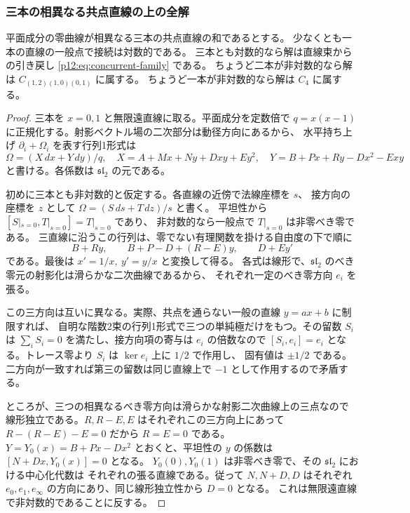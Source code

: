 \subsubsection{三本の相異なる共点直線の上の全解}
\label{p12:sec:concurrentfibers}
\begin{theorem}\label{p12:th:all-concurrent}
平面成分の零曲線が相異なる三本の共点直線の和であるとする。
少なくとも一本の直線の一般点で接続は対数的である。
三本とも対数的なら解は直線束からの引き戻し \eqref{p12:eq:concurrent-family} である。
ちょうど二本が非対数的なら解は $C_{(1,2)(1,0)(0,1)}$ に属する。
ちょうど一本が非対数的なら解は $C_4$ に属する。
\end{theorem}
\begin{proof}
三本を $x=0,1$ と無限遠直線に取る。平面成分を定数倍で
$q=x(x-1)$ に正規化する。射影ベクトル場の二次部分は動径方向にあるから、
水平持ち上げ $\partial_i+\Omega_i$ を表す行列1形式は
\[
 \Omega=(X\,dx+Y\,dy)/q,\quad
 X=A+Mx+Ny+Dxy+Ey^2,\quad
 Y=B+Px+Ry-Dx^2-Exy
\]
と書ける。各係数は $\mathfrak{sl}_2$ の元である。

初めに三本とも非対数的と仮定する。各直線の近傍で法線座標を $s$、
接方向の座標を $z$ として $\Omega=(S\,ds+T\,dz)/s$ と書く。
平坦性から $[S|_{s=0},T|_{s=0}]=T|_{s=0}$ であり、
非対数的なら一般点で $T|_{s=0}$ は非零べき零である。
三直線に沿うこの行列は、零でない有理関数を掛ける自由度の下で順に
\[
 B+Ry,\qquad B+P-D+(R-E)y,\qquad D+Ey'
\]
である。最後は $x'=1/x,\ y'=y/x$ と変換して得る。
各式は線形で、$\mathfrak{sl}_2$ のべき零元の射影化は滑らかな二次曲線であるから、
それぞれ一定のべき零方向 $e_i$ を張る。

この三方向は互いに異なる。実際、共点を通らない一般の直線 $y=ax+b$ に制限すれば、
自明な階数2束の行列1形式で三つの単純極だけをもつ。その留数 $S_i$ は
$\sum_i S_i=0$ を満たし、接方向項の寄与は $e_i$ の倍数なので
$[S_i,e_i]=e_i$ となる。トレース零より $S_i$ は $\ker e_i$ 上に $1/2$ で作用し、
固有値は $\pm1/2$ である。二方向が一致すれば第三の留数は同じ直線上で
$-1$ として作用するので矛盾する。

ところが、三つの相異なるべき零方向は滑らかな射影二次曲線上の三点なので
線形独立である。$R,R-E,E$ はそれぞれこの三方向上にあって
$R-(R-E)-E=0$ だから $R=E=0$ である。
$Y=Y_0(x)=B+Px-Dx^2$ とおくと、平坦性の $y$ の係数は $[N+Dx,Y_0(x)]=0$ となる。
$Y_0(0),Y_0(1)$ は非零べき零で、その $\mathfrak{sl}_2$ における中心化代数は
それぞれの張る直線である。従って $N,N+D,D$ はそれぞれ $e_0,e_1,e_\infty$
の方向にあり、同じ線形独立性から $D=0$ となる。
これは無限遠直線で非対数的であることに反する。


\end{proof}
